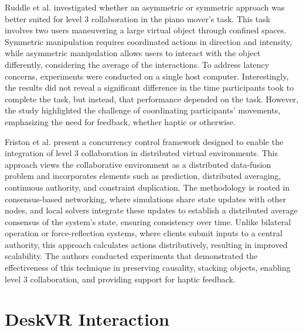     Ruddle et al. \cite{ruddleSymmetricAsymmetricAction2002} investigated whether an asymmetric or symmetric approach was better suited for level 3 collaboration in the piano mover's task. This task involves two users maneuvering a large virtual object through confined spaces. Symmetric manipulation requires coordinated actions in direction and intensity, while asymmetric manipulation allows users to interact with the object differently, considering the average of the interactions. To address latency concerns, experiments were conducted on a single host computer. Interestingly, the results did not reveal a significant difference in the time participants took to complete the task, but instead, that performance depended on the task. However, the study highlighted the challenge of coordinating participants' movements, emphasizing the need for feedback, whether haptic or otherwise.

    Friston et al. \cite{fristonConsensusBasedNetworking2022} present a concurrency control framework designed to enable the integration of level 3 collaboration in distributed virtual environments. This approach views the collaborative environment as a distributed data-fusion problem and incorporates elements such as prediction, distributed averaging, continuous authority, and constraint duplication. The methodology is rooted in consensus-based networking, where simulations share state updates with other nodes, and local solvers integrate these updates to establish a distributed average consensus of the system's state, ensuring consistency over time. Unlike bilateral operation or force-reflection systems, where clients submit inputs to a central authority, this approach calculates actions distributively, resulting in improved scalability. The authors conducted experiments that demonstrated the effectiveness of this technique in preserving causality, stacking objects, enabling level 3 collaboration, and providing support for haptic feedback.

\section{DeskVR Interaction} \label{sec:sota_interaction}

